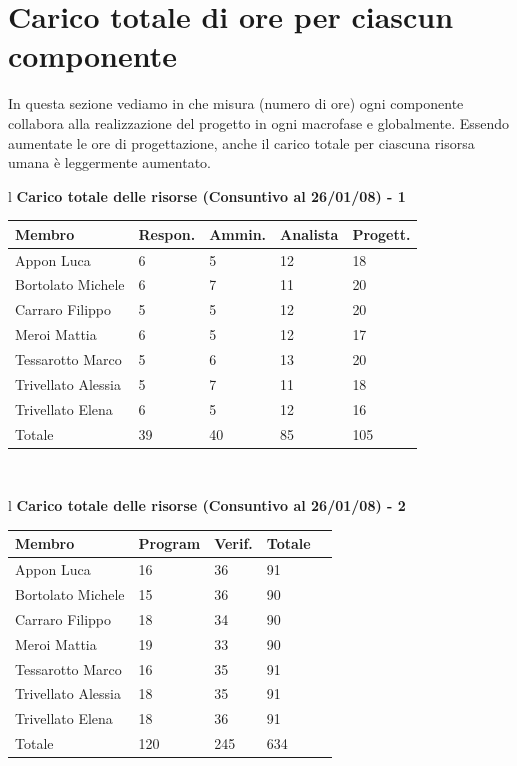 \documentclass[11pt,titlepage,a4paper]{report}
\begin{document}
\newpage

\section{Carico totale di ore per ciascun componente}
In questa sezione vediamo in che misura (numero di ore) ogni componente collabora alla 
realizzazione del progetto in ogni macrofase e globalmente.
Essendo aumentate le ore di progettazione, anche il carico totale 
per ciascuna risorsa umana \`e leggermente aumentato.

\begin{table}[hbtp]
\large{
\begin{tabular}{l}
\Large{\textbf{\textsf{Carico totale delle risorse (Consuntivo al 26/01/08) - 1}}} \\
\begin{tabular}{||p{3.5cm}||p{2cm}||p{2cm}||p{2cm}||p{2cm}||} \hline
\textbf{Membro} & \textbf{Respon.} & \textbf{Ammin.} & \textbf{Analista} & \textbf{Progett.}\\ \hline
{Appon Luca}&6&5&12&18 \\ \hline
{Bortolato Michele} &6&7&11&20\\ \hline
{Carraro Filippo}&5&5&12&20 \\ \hline
{Meroi Mattia}&6&5&12&17\\ \hline
{Tessarotto Marco} &5&6&13&20\\ \hline
{Trivellato Alessia} &5&7&11&18 \\ \hline
{Trivellato Elena} &6&5&12&16 \\ \hline
{Totale}& 39&40&85&105 \\ \hline
\end{tabular} \\
\end{tabular}
}
\end{table}

\begin{table}[hbtp]
\large{
\begin{tabular}{l}
\Large{\textbf{\textsf{Carico totale delle risorse (Consuntivo al 26/01/08) - 2}}} \\
\begin{tabular}{||p{3.5cm}||p{2cm}||p{2cm}||p{2cm}||p{2cm}||} \hline
\textbf{Membro} & \textbf{Program} & \textbf{Verif.} & \textbf{Totale}\\ \hline
{Appon Luca}&16&36&91 \\ \hline 
{Bortolato Michele} &15&36&90\\ \hline
{Carraro Filippo}&18&34&90 \\ \hline
{Meroi Mattia}&19&33&90\\ \hline
{Tessarotto Marco} &16&35&91\\ \hline
{Trivellato Alessia} &18&35&91 \\ \hline
{Trivellato Elena} &18&36&91 \\ \hline
{Totale} &120&245&634 \\ \hline
\end{tabular} \\
\end{tabular}
}
\end{table}
\end{document}
